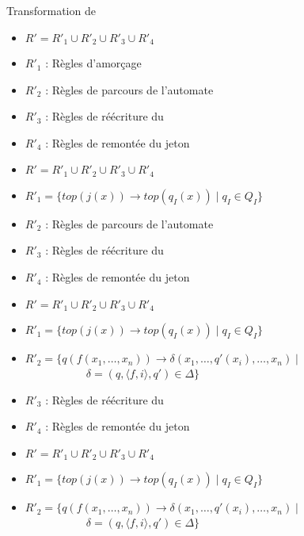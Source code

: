 \begin{frame}{Transformation de \pctrs}
  \begin{overprint}
    \begin{itemize}
    \item $R' = R'_1 \cup R'_2 \cup R'_3 \cup R'_4$
    \item $R'_1$ : Règles d'amorçage
    \item $R'_2$ : Règles de parcours de l'automate
    \item $R'_3$ : Règles de réécriture du \pctrs
    \item $R'_4$ : Règles de remontée du jeton
    \end{itemize}
    \begin{itemize}
    \item $R' = R'_1 \cup R'_2 \cup R'_3 \cup R'_4$
    \item $R'_1 = \{top(j(x)) \rightarrow top(q_I(x)) \mid q_I \in Q_I\}$
    \item $R'_2$ : Règles de parcours de l'automate
    \item $R'_3$ : Règles de réécriture du \pctrs
    \item $R'_4$ : Règles de remontée du jeton
    \end{itemize}
    \begin{itemize}
    \item $R' = R'_1 \cup R'_2 \cup R'_3 \cup R'_4$
    \item $R'_1 = \{top(j(x)) \rightarrow top(q_I(x)) \mid q_I \in Q_I\}$
    \item $R'_2 = \{q(f(x_1,\ldots,x_n))\rightarrow \delta(x_1,\ldots,q'(x_i),\ldots,x_n) \mid$\\
      ~~~~~~~~~~~$\delta=(q, \langle f,i \rangle, q') \in \Delta\}$
    \item $R'_3$ : Règles de réécriture du \pctrs
    \item $R'_4$ : Règles de remontée du jeton
    \end{itemize}
    \begin{itemize}
    \item $R' = R'_1 \cup R'_2 \cup R'_3 \cup R'_4$
    \item $R'_1 = \{top(j(x)) \rightarrow top(q_I(x)) \mid q_I \in Q_I\}$
    \item $R'_2 = \{q(f(x_1,\ldots,x_n))\rightarrow \delta(x_1,\ldots,q'(x_i),\ldots,x_n) \mid$\\
      ~~~~~~~~~~~$\delta=(q, \langle f,i \rangle, q') \in \Delta\}$

\end{itemize}
\end{overprint}
\end{frame}
